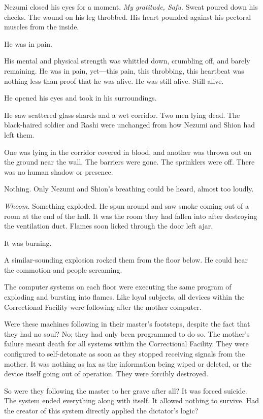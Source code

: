 Nezumi closed his eyes for a moment. \emph{My gratitude, Safu.} Sweat poured
down his cheeks. The wound on his leg throbbed. His heart pounded
against his pectoral muscles from the inside.

He was in pain.

His mental and physical strength was whittled down, crumbling off, and
barely remaining. He was in pain, yet―this pain, this throbbing, this
heartbeat was nothing less than proof that he was alive. He was still
alive. Still alive.

He opened his eyes and took in his surroundings.

He saw scattered glass shards and a wet corridor. Two men lying dead.
The black-haired soldier and Rashi were unchanged from how Nezumi and
Shion had left them.

One was lying in the corridor covered in blood, and another was thrown
out on the ground near the wall. The barriers were gone. The sprinklers
were off. There was no human shadow or presence.

Nothing. Only Nezumi and Shion's breathing could be heard, almost too
loudly.

\emph{Whoom.} Something exploded. He spun around and saw smoke coming out of a
room at the end of the hall. It was the room they had fallen into after
destroying the ventilation duct. Flames soon licked through the door
left ajar.

It was burning.

A similar-sounding explosion rocked them from the floor below. He could
hear the commotion and people screaming.

The computer systems on each floor were executing the same program of
exploding and bursting into flames. Like loyal subjects, all devices
within the Correctional Facility were following after the mother
computer.

Were these machines following in their master's footsteps, despite the
fact that they had no soul? No; they had only been programmed to do so.
The mother's failure meant death for all systems within the Correctional
Facility. They were configured to self-detonate as soon as they stopped
receiving signals from the mother. It was nothing as lax as the
information being wiped or deleted, or the device itself going out of
operation. They were forcibly destroyed.

So were they following the master to her grave after all? It was forced
suicide. The system ended everything along with itself. It allowed
nothing to survive. Had the creator of this system directly applied the
dictator's logic?

